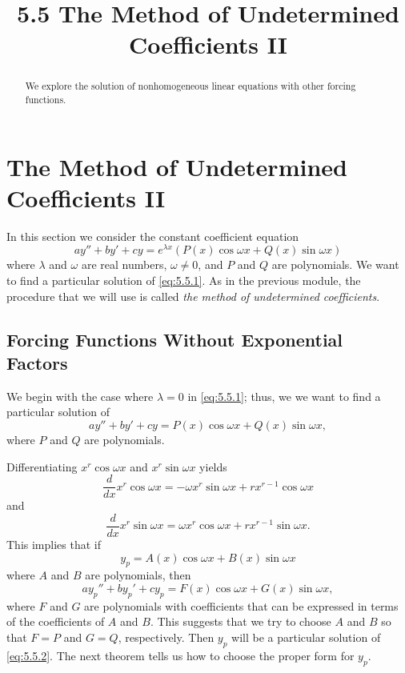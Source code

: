 \documentclass{ximera}
\title{5.5 The Method of Undetermined Coefficients II}
\begin{document}
 
\begin{abstract}
  We explore the solution of nonhomogeneous linear equations with other forcing functions.
\end{abstract}
 
\maketitle
 
\section*{The Method of Undetermined Coefficients II}
 
In this section we consider the constant coefficient equation
\begin{equation} \label{eq:5.5.1}
ay''+by'+cy=e^{\lambda x}\left(P(x)\cos \omega x+Q(x)\sin \omega x\right)
\end{equation}
where $\lambda$ and $\omega$ are real numbers, $\omega\neq 0$, and $P$
and $Q$ are polynomials. We want to find a particular solution of
\eqref{eq:5.5.1}. As in the previous module, the procedure that we
will use is called \textit{the method of undetermined coefficients}.
 
\subsection*{Forcing Functions Without Exponential Factors}
 
We begin with the case where $\lambda=0$ in \eqref{eq:5.5.1};   thus, we
we
want to find a particular solution of
\begin{equation} \label{eq:5.5.2}
ay''+by'+cy=P(x)\cos\omega x+Q(x)\sin\omega x,
\end{equation}
where $P$ and $Q$ are polynomials.
 
Differentiating  $x^r\cos\omega x$ and $x^r\sin\omega x$ yields
$$
\frac{d}{dx}x^r\cos\omega x=-\omega x^r\sin\omega x+
rx^{r-1}\cos\omega x
$$
and
$$
\frac{d}{dx}x^r\sin\omega x=\omega x^r\cos\omega x+
rx^{r-1}\sin\omega x.
$$
This implies  that if
$$
y_p=A(x)\cos\omega x+B(x)\sin\omega x
$$
where $A$ and $B$ are polynomials, then
$$
ay_p''+by_p'+cy_p=F(x)\cos\omega x+G(x)\sin\omega x,
$$
where $F$ and $G$ are polynomials with coefficients that can be
expressed in terms of the coefficients of $A$ and $B$. This suggests
that we try to choose $A$ and $B$ so that $F=P$ and $G=Q$,
respectively. Then $y_p$ will be a particular solution of
\eqref{eq:5.5.2}. The next theorem tells us how to choose the proper
form for $y_p$. %
 
\end{document}
